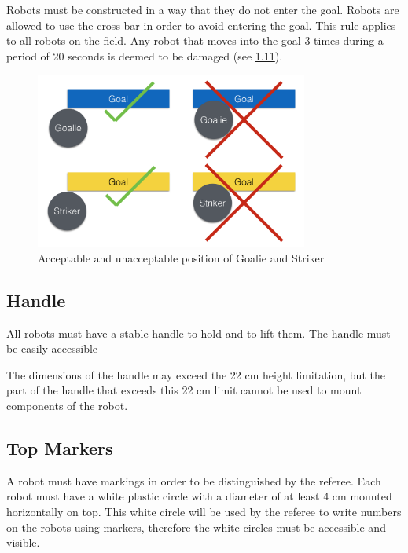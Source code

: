 \documentclass{article}
\begin{document}
Robots must be constructed in a way that they do not enter the goal. Robots are
allowed to use the cross-bar in order to avoid entering the goal. This rule
applies to all robots on the field. Any robot that moves into the goal 3 times
during a period of 20 seconds is deemed to be damaged (see
\hyperref[ref-012]{1.11}).

\begin{figure}[H]
    \centering
    \includegraphics[width=0.8\textwidth]{media/image3.png}
    \caption{Acceptable and unacceptable position of Goalie and Striker}
    \label{fig:robot_in_goal}
\end{figure}

\subsection{ Handle \label{ref-handle}}

All robots must have a stable  handle to
hold and to lift them. The handle must be easily accessible 

The dimensions of the handle may exceed the 22 cm height limitation, but the
part of the handle that exceeds this 22 cm limit cannot be used to mount
components of the robot.

\subsection{ Top Markers\label{ref-top-markers}}

A robot must have markings in order to be distinguished by the referee. Each
robot must have a white plastic circle with a diameter of at least 4 cm mounted
horizontally on top. This white circle will be used by the referee to write
numbers on the robots using markers, therefore the white circles must be
accessible and visible.
\end{document}
